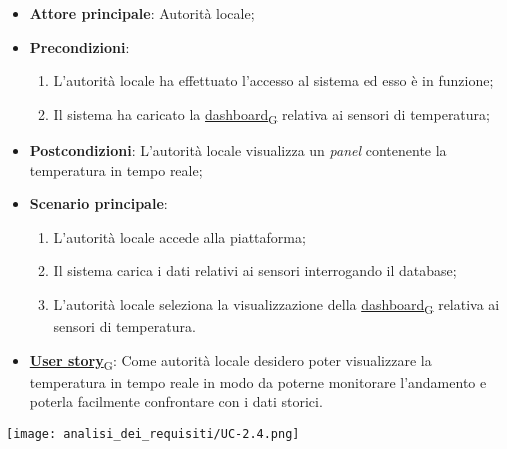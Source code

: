 \begin{itemize}
	\item \textbf{Attore principale}: Autorità locale;
	\item \textbf{Precondizioni}:
	      \begin{enumerate}
		      \item L'autorità locale ha effettuato l'accesso al sistema ed esso è in funzione;
		      \item Il sistema ha caricato la \href{https://7last.github.io/docs/rtb/documentazione-interna/glossario\#dashboard}{dashboard\textsubscript{G}} relativa ai sensori di temperatura;
	      \end{enumerate}
	\item \textbf{Postcondizioni}: L'autorità locale visualizza un \textit{panel} contenente la temperatura in tempo reale;
	\item \textbf{Scenario principale}:
	      \begin{enumerate}
		      \item L'autorità locale accede alla piattaforma;
		      \item Il sistema carica i dati relativi ai sensori interrogando il database;
		      \item L'autorità locale seleziona la visualizzazione della \href{https://7last.github.io/docs/rtb/documentazione-interna/glossario\#dashboard}{dashboard\textsubscript{G}} relativa ai sensori di temperatura.
	      \end{enumerate}
	\item \href{https://7last.github.io/docs/rtb/documentazione-interna/glossario\#user-story}{\textbf{User story}\textsubscript{G}}:
	      Come autorità locale desidero poter visualizzare la temperatura in tempo reale in modo da poterne monitorare l'andamento
	      e poterla facilmente confrontare con i dati storici.
\end{itemize}
\begin{center}
	\texttt{[image: analisi\_dei\_requisiti/UC-2.4.png]}
\end{center}

